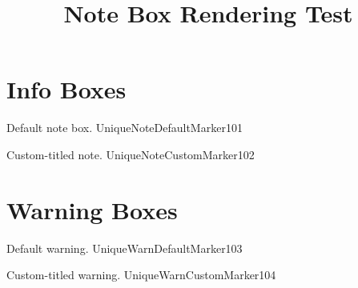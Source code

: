 \documentclass{SUSTechHomework}
\title{Note Box Rendering Test}
\begin{document}
\maketitle

\section{Info Boxes}

\begin{sustechnote}
Default note box. UniqueNoteDefaultMarker101
\end{sustechnote}

\begin{sustechnote}[title=Design Note]
Custom-titled note. UniqueNoteCustomMarker102
\end{sustechnote}

\section{Warning Boxes}

\begin{sustechwarning}
Default warning. UniqueWarnDefaultMarker103
\end{sustechwarning}

\begin{sustechwarning}[title=Danger Zone]
Custom-titled warning. UniqueWarnCustomMarker104
\end{sustechwarning}
\end{document}
